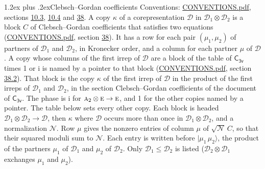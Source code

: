 \documentclass[10pt,a4paper]{article}
\makeatletter
\renewcommand\section{\@startsection{section}{1}{\z@}{-3ex plus -1ex minus -.2ex}%
  {1.2ex plus .2ex}{\normalfont\large\sffamily\bfseries\color{parttitle}}}
\numberwithin{equation}{section}
\newcommand{\grp}[1]{\mathsf{#1}}
\newcommand{\irr}[1]{\text{\normalfont\scshape #1}}
\newcommand{\iunit}{\mathrm{i}}
\newcommand{\irrprod}{\otimes}
\newcommand{\mult}{\kappa}
\newcommand{\intx}{\mu}
\newcommand{\cgnorm}{\mathcal{N}}
\newcommand{\prodket}[2]{\lvert {#1}\,{#2}\rangle}
\makeatother
\begin{document}
\section{Clebsch--Gordan coefficients}\label{s:clebsch_gordan}
Conventions: \href{../../CONVENTIONS.pdf}{CONVENTIONS.pdf}, sections \href{../../../rotation/CONVENTIONS.pdf\#conv.10.3}{10.3}, \href{../../../rotation/CONVENTIONS.pdf\#conv.10.4}{10.4} and \href{../../CONVENTIONS.pdf\#conv.38}{38}.
\leavevmode\label{n:index.copy}\label{n:matrix.cg.stored}A copy $\mult$ of a corepresentation $\mathcal{D}$ in $\mathcal{D}_1\irrprod\mathcal{D}_2$ is a block $C$ of Clebsch--Gordan coefficients that satisfies two equations (\href{../../CONVENTIONS.pdf}{CONVENTIONS.pdf}, section \href{../../CONVENTIONS.pdf\#conv.38}{38}). \label{n:index.cg}It has a row for each pair $(\intx_1, \intx_2)$ of partners of $\mathcal{D}_1$ and $\mathcal{D}_2$, in Kronecker order, and a column for each partner $\intx$ of $\mathcal{D}$.
A copy whose columns of the first irrep of $\mathcal{D}$ are a block of the table of $\grp{C_{3v}}$ times 1 or $\iunit$ is named by a pointer to that block (\href{../../CONVENTIONS.pdf}{CONVENTIONS.pdf}, section \href{../../CONVENTIONS.pdf\#conv.38.2}{38.2}). That block is the copy $\mult$ of the first irrep of $\mathcal{D}$ in the product of the first irreps of $\mathcal{D}_1$ and $\mathcal{D}_2$, in the section Clebsch--Gordan coefficients of the document of \href{../../../rotation/data/pdf/C3v.pdf}{$\grp{C_{3v}}$}. The phase is $\iunit$ for $\irr{a}_{2}\irrprod \irr{e}\to \irr{e}$, and 1 for the other copies named by a pointer. The table below sets every other copy.
Each block is headed $\mathcal{D}_1\irrprod\mathcal{D}_2\to\mathcal{D}$, then $\mult$ where $\mathcal{D}$ occurs more than once in $\mathcal{D}_1\irrprod\mathcal{D}_2$, and a normalization $\cgnorm$. Row $\intx$ gives the nonzero entries of column $\intx$ of $\sqrt{\cgnorm}\,C$, so that their squared moduli sum to $\cgnorm$. \label{n:vector.ket.product}Each entry is written before $\prodket{\intx_1}{\intx_2}$, the product of the partners $\intx_1$ of $\mathcal{D}_1$ and $\intx_2$ of $\mathcal{D}_2$. Only $\mathcal{D}_1 \le \mathcal{D}_2$ is listed ($\mathcal{D}_2\irrprod\mathcal{D}_1$ exchanges $\intx_1$ and $\intx_2$).
\end{document}
